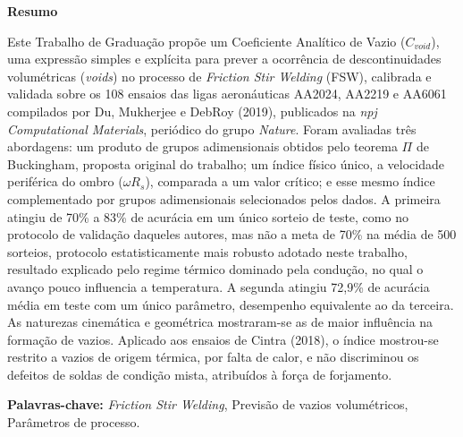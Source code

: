 \documentclass[12pt,openany]{report}
\begin{document}
\vspace*{2.5cm}

\begin{center}
    {\fontsize{18}{22}\selectfont\bfseries Resumo\par}
\end{center}

\vspace{1.8cm}
Este Trabalho de Graduação propõe um Coeficiente Analítico de Vazio ($C_{void}$), uma expressão simples e explícita para prever a ocorrência de descontinuidades volumétricas (\textit{voids}) no processo de \textit{Friction Stir Welding} (FSW), calibrada e validada sobre os 108 ensaios das ligas aeronáuticas AA2024, AA2219 e AA6061 compilados por Du, Mukherjee e DebRoy (2019), publicados na \textit{npj Computational Materials}, periódico do grupo \textit{Nature}. Foram avaliadas três abordagens: um produto de grupos adimensionais obtidos pelo teorema $\Pi$ de Buckingham, proposta original do trabalho; um índice físico único, a velocidade periférica do ombro ($\omega R_s$), comparada a um valor crítico; e esse mesmo índice complementado por grupos adimensionais selecionados pelos dados. A primeira atingiu de 70\% a 83\% de acurácia em um único sorteio de teste, como no protocolo de validação daqueles autores, mas não a meta de 70\% na média de 500 sorteios, protocolo estatisticamente mais robusto adotado neste trabalho, resultado explicado pelo regime térmico dominado pela condução, no qual o avanço pouco influencia a temperatura. A segunda atingiu 72,9\% de acurácia média em teste com um único parâmetro, desempenho equivalente ao da terceira. As naturezas cinemática e geométrica mostraram-se as de maior influência na formação de vazios. Aplicado aos ensaios de Cintra (2018), o índice mostrou-se restrito a vazios de origem térmica, por falta de calor, e não discriminou os defeitos de soldas de condição mista, atribuídos à força de forjamento.

\vspace{1.0cm}
\noindent \textbf{Palavras-chave:} \textit{Friction Stir Welding}, Previsão de vazios volumétricos, Parâmetros de processo.

\newpage


\vspace*{2.5cm}
\end{document}
